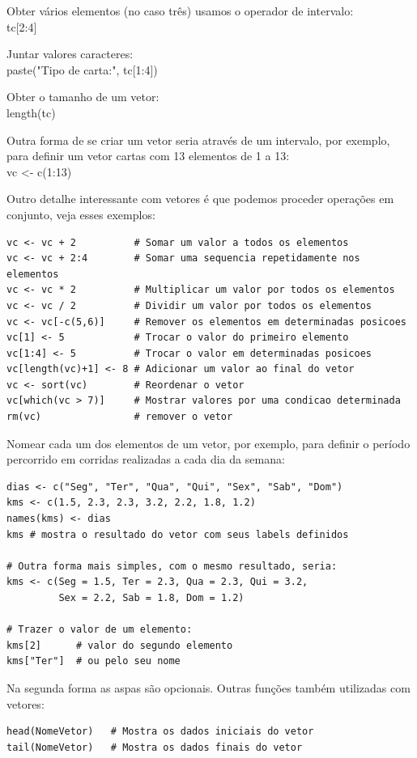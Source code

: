 \documentclass[a4paper,11pt]{article}
\begin{document}
Obter vários elementos (no caso três) usamos o operador de intervalo: \\
{\ttfamily tc[2:4]}

Juntar valores caracteres: \\
{\ttfamily paste("Tipo de carta:", tc[1:4])}

Obter o tamanho de um vetor: \\
{\ttfamily length(tc)}

Outra forma de se criar um vetor seria através de um intervalo, por exemplo, para definir um vetor cartas com 13 elementos de 1 a 13: \\
{\ttfamily vc <- c(1:13)}

Outro detalhe interessante com vetores é que podemos proceder operações em 
conjunto, veja esses exemplos:
\begin{lstlisting}
vc <- vc + 2          # Somar um valor a todos os elementos
vc <- vc + 2:4        # Somar uma sequencia repetidamente nos elementos
vc <- vc * 2          # Multiplicar um valor por todos os elementos
vc <- vc / 2          # Dividir um valor por todos os elementos
vc <- vc[-c(5,6)]     # Remover os elementos em determinadas posicoes
vc[1] <- 5            # Trocar o valor do primeiro elemento
vc[1:4] <- 5          # Trocar o valor em determinadas posicoes
vc[length(vc)+1] <- 8 # Adicionar um valor ao final do vetor 
vc <- sort(vc)        # Reordenar o vetor
vc[which(vc > 7)]     # Mostrar valores por uma condicao determinada
rm(vc)                # remover o vetor
\end{lstlisting}

Nomear cada um dos elementos de um vetor, por exemplo, para definir o período percorrido em corridas realizadas a cada dia da semana:
\begin{lstlisting}
dias <- c("Seg", "Ter", "Qua", "Qui", "Sex", "Sab", "Dom")
kms <- c(1.5, 2.3, 2.3, 3.2, 2.2, 1.8, 1.2)
names(kms) <- dias
kms # mostra o resultado do vetor com seus labels definidos

# Outra forma mais simples, com o mesmo resultado, seria:
kms <- c(Seg = 1.5, Ter = 2.3, Qua = 2.3, Qui = 3.2, 
         Sex = 2.2, Sab = 1.8, Dom = 1.2)
         
# Trazer o valor de um elemento:
kms[2]      # valor do segundo elemento
kms["Ter"]  # ou pelo seu nome
\end{lstlisting}

Na segunda forma as aspas são opcionais. Outras funções também utilizadas com vetores:
\begin{lstlisting}
head(NomeVetor)   # Mostra os dados iniciais do vetor
tail(NomeVetor)   # Mostra os dados finais do vetor
\end{lstlisting}
\end{document}
